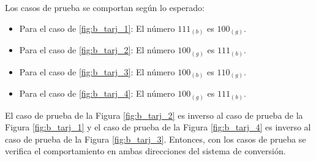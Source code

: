 \documentclass[../procedimientos.tex]{subfiles}
\begin{document}
Los casos de prueba se comportan según lo esperado:
\begin{itemize}
  \item Para el caso de \ref{fig:b_tarj_1}: El número $111_{(b)}$ es 
    $100_{(g)}$.
  \item Para el caso de \ref{fig:b_tarj_2}: El número $100_{(g)}$ es 
    $111_{(b)}$.
  \item Para el caso de \ref{fig:b_tarj_3}: El número $100_{(b)}$ es 
    $110_{(g)}$.
  \item Para el caso de \ref{fig:b_tarj_4}: El número $100_{(g)}$ es 
    $111_{(b)}$.
\end{itemize}

El caso de prueba de la Figura \ref{fig:b_tarj_2} es inverso al caso de prueba 
de la Figura \ref{fig:b_tarj_1} y el caso de prueba de la Figura 
\ref{fig:b_tarj_4} es inverso al caso de prueba de la Figura 
\ref{fig:b_tarj_3}. Entonces, con los casos de prueba se verifica el 
comportamiento en ambas direcciones del sistema de conversión.
\end{document}
